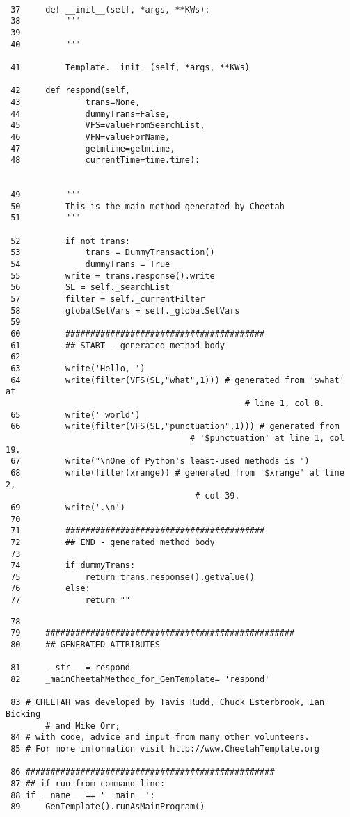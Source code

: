\begin{verbatim}
    
 37	    def __init__(self, *args, **KWs):
 38	        """
 39	        
 40	        """
    
 41	        Template.__init__(self, *args, **KWs)
    
 42	    def respond(self,
 43	            trans=None,
 44	            dummyTrans=False,
 45	            VFS=valueFromSearchList,
 46	            VFN=valueForName,
 47	            getmtime=getmtime,
 48	            currentTime=time.time):
    
    
 49	        """
 50	        This is the main method generated by Cheetah
 51	        """
    
 52	        if not trans:
 53	            trans = DummyTransaction()
 54	            dummyTrans = True
 55	        write = trans.response().write
 56	        SL = self._searchList
 57	        filter = self._currentFilter
 58	        globalSetVars = self._globalSetVars
 59	        
 60	        ########################################
 61	        ## START - generated method body
 62	        
 63	        write('Hello, ')
 64	        write(filter(VFS(SL,"what",1))) # generated from '$what' at 
                                                # line 1, col 8.
 65	        write(' world')
 66	        write(filter(VFS(SL,"punctuation",1))) # generated from 
                                     # '$punctuation' at line 1, col 19.
 67	        write("\nOne of Python's least-used methods is ")
 68	        write(filter(xrange)) # generated from '$xrange' at line 2, 
                                      # col 39.
 69	        write('.\n')
 70	        
 71	        ########################################
 72	        ## END - generated method body
 73	        
 74	        if dummyTrans:
 75	            return trans.response().getvalue()
 76	        else:
 77	            return ""
\end{verbatim}
\begin{verbatim}
 78	        
 79	    ##################################################
 80	    ## GENERATED ATTRIBUTES

 81	    __str__ = respond
 82	    _mainCheetahMethod_for_GenTemplate= 'respond'

 83	# CHEETAH was developed by Tavis Rudd, Chuck Esterbrook, Ian Bicking 
        # and Mike Orr;
 84	# with code, advice and input from many other volunteers.
 85	# For more information visit http://www.CheetahTemplate.org
    
 86	##################################################
 87	## if run from command line:
 88	if __name__ == '__main__':
 89	    GenTemplate().runAsMainProgram()
    
\end{verbatim}

